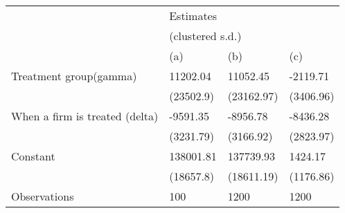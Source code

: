 \begin{tabular}{llll}
\toprule
{} & \multicolumn{3}{l}{Estimates} \\
{} & \multicolumn{3}{l}{(clustered s.d.)} \\
{} &              (a) &         (b) &        (c) \\
\midrule
Treatment group(gamma)         &         11202.04 &    11052.45 &   -2119.71 \\
                               &        (23502.9) &  (23162.97) &  (3406.96) \\
When a firm is treated (delta) &         -9591.35 &    -8956.78 &   -8436.28 \\
                               &        (3231.79) &   (3166.92) &  (2823.97) \\
Constant                       &        138001.81 &   137739.93 &    1424.17 \\
                               &        (18657.8) &  (18611.19) &  (1176.86) \\
Observations                   &              100 &        1200 &       1200 \\
\bottomrule
\end{tabular}
